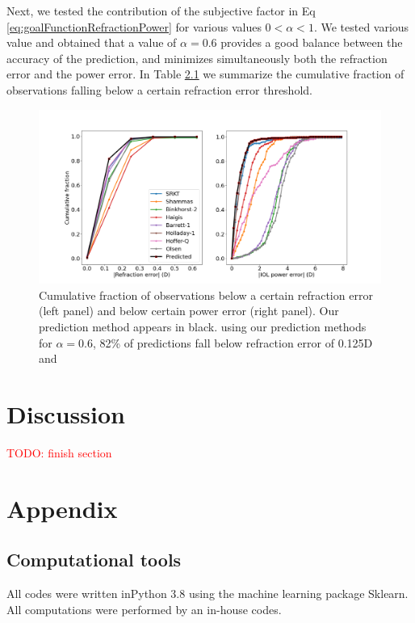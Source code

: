\documentclass[article,twocolumn,preprint,10pt]{paper}%
\renewcommand{\(}{\left(}
\renewcommand{\)}{\right)}
\renewcommand{\[}{\left[}
\renewcommand{\]}{\right]}
\newcommand{\red}{\textcolor{red}}
\newcommand{\1}{\mbox{\boldmath$1$}}
\begin{document}
Next, we tested the contribution of the subjective factor in Eq \ref{eq:goalFunctionRefractionPower} for various values $0<\alpha<1$. We tested various value and obtained that a value of $\alpha=0.6$ provides a good balance between the accuracy of the prediction, and minimizes simultaneously both the refraction error and the power error. In Table \ref{} we summarize the cumulative fraction of observations falling below a certain refraction error threshold. 


\begin{figure}
	\centering
	\includegraphics[width=1\linewidth]{powerAndRefErr_alpha0_6}
	\caption{Cumulative fraction of observations below a certain refraction error (left panel) and below certain power error (right panel). Our prediction method appears in black. using our prediction methods for $\alpha=0.6$, 82\% of predictions fall below refraction error of 0.125D and }
	\label{fig:PowerAndRefErrAlpha06}
\end{figure}

\section{Discussion}\label{section:Discussion}
\red{TODO: finish section}

\section{Appendix}\label{section:iolFormulas}
\subsection{Computational tools}
All codes were written inPython 3.8 using the machine learning package Sklearn. 
All computations were performed by an in-house codes.
\end{document}
